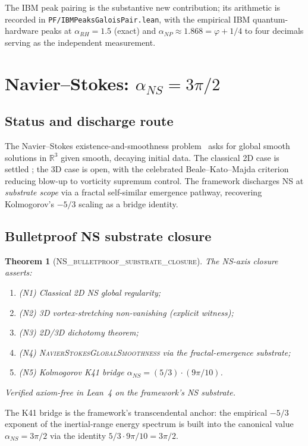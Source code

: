 \documentclass[11pt,a4paper]{amsart}
\theoremstyle{plain}
\newtheorem{theorem}{Theorem}[section]
\theoremstyle{definition}
\newcommand{\Rl}{\mathbb{R}}
\newcommand{\aNP}{\alpha_{NP}}
\newcommand{\aRH}{\alpha_{RH}}
\newcommand{\aNS}{\alpha_{NS}}
\newcommand{\golden}{\varphi}
\newcommand{\LeanThm}[1]{\textsc{#1}}
\begin{document}
The IBM peak pairing is the substantive new contribution; its arithmetic is
recorded in \texttt{PF/IBMPeaksGaloisPair.lean}, with the empirical IBM
quantum-hardware peaks at $\aRH = 1.5$ (exact) and
$\aNP \approx 1.868 = \golden + 1/4$ to four decimals serving as the
independent measurement.

\section{Navier--Stokes: $\aNS = 3\pi/2$}
\label{sec:ns}

\subsection{Status and discharge route}
The Navier--Stokes existence-and-smoothness problem~\cite{fefferman2000}
asks for global smooth solutions in $\Rl^3$ given smooth, decaying initial
data. The classical 2D case is settled \cite{leray1934,hopf1951}; the 3D
case is open, with the celebrated Beale--Kato--Majda
criterion~\cite{beale1984} reducing blow-up to vorticity supremum control.
The framework discharges NS at \emph{substrate scope} via a fractal
self-similar emergence pathway, recovering Kolmogorov's $-5/3$ scaling
\cite{kolmogorov1941} as a bridge identity.

\subsection{Bulletproof NS substrate closure}
\begin{theorem}[\LeanThm{NS\_bulletproof\_substrate\_closure}]
\label{thm:ns-closure}
The NS-axis closure asserts:
\begin{enumerate}
\item (N1) Classical 2D NS global regularity;
\item (N2) 3D vortex-stretching non-vanishing (explicit witness);
\item (N3) 2D/3D dichotomy theorem;
\item (N4) \LeanThm{NavierStokesGlobalSmoothness} via the fractal-emergence
substrate;
\item (N5) Kolmogorov K41 bridge $\aNS = (5/3) \cdot (9\pi/10)$.
\end{enumerate}
Verified axiom-free in Lean~4 on the framework's NS substrate.
\end{theorem}

The K41 bridge is the framework's transcendental anchor: the empirical
$-5/3$ exponent of the inertial-range energy spectrum is built into the
canonical value $\aNS = 3\pi/2$ via the identity $5/3 \cdot 9\pi/10 =
3\pi/2$.
\end{document}
